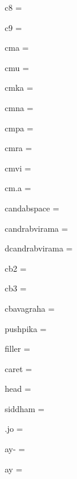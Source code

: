 \documentclass{article}
\begin{document}
\begin{multicols}{6}
\noindent c8 = {\fdeva {}}\par
\noindent c9 = {\fdeva {}}\par
\noindent cma = {\fdeva {}}\par
\noindent cmu = {\fdeva {}}\par
\noindent cmka = {\fdeva {}}\par
\noindent cmna = {\fdeva {}}\par
\noindent cmpa = {\fdeva {}}\par
\noindent cmra = {\fdeva {}}\par
\noindent cmvi = {\fdeva {}}\par
\noindent cm.a = {\fdeva {}}\par
\noindent candabspace = {\fdeva {}}\par
\noindent candrabvirama = {\fdeva {}}\par
\noindent dcandrabvirama = {\fdeva {}}\par
\noindent cb2 = {\fdeva {}}\par
\noindent cb3 = {\fdeva {}}\par
\noindent cbavagraha = {\fdeva {}}\par
\noindent pushpika = {\fdeva {}}\par
\noindent filler = {\fdeva {}}\par
\noindent caret = {\fdeva {}}\par
\noindent head = {\fdeva {}}\par
\noindent siddham = {\fdeva {}}\par
\noindent .jo = {\fdeva {}}\par
\noindent ay- = {\fdeva {}}\par
\noindent ay = {\fdeva {}}\par
\end{multicols}


{\fdeva {}}
\end{document}
